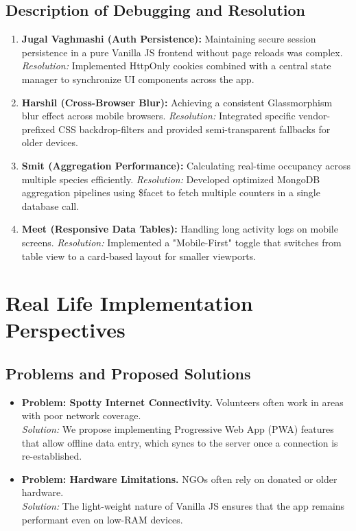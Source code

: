 \documentclass[12pt,a4paper]{report}
\begin{document}
\section{Description of Debugging and Resolution}
\begin{enumerate}
    \item \textbf{Jugal Vaghmashi (Auth Persistence):} Maintaining secure session persistence in a pure Vanilla JS frontend without page reloads was complex. \textit{Resolution:} Implemented HttpOnly cookies combined with a central state manager to synchronize UI components across the app.
    \item \textbf{Harshil (Cross-Browser Blur):} Achieving a consistent Glassmorphism blur effect across mobile browsers. \textit{Resolution:} Integrated specific vendor-prefixed CSS backdrop-filters and provided semi-transparent fallbacks for older devices.
    \item \textbf{Smit (Aggregation Performance):} Calculating real-time occupancy across multiple species efficiently. \textit{Resolution:} Developed optimized MongoDB aggregation pipelines using \$facet to fetch multiple counters in a single database call.
    \item \textbf{Meet (Responsive Data Tables):} Handling long activity logs on mobile screens. \textit{Resolution:} Implemented a "Mobile-First" toggle that switches from table view to a card-based layout for smaller viewports.
\end{enumerate}

\chapter{Real Life Implementation Perspectives}
\section{Problems and Proposed Solutions}
\begin{itemize}
    \item \textbf{Problem: Spotty Internet Connectivity.} Volunteers often work in areas with poor network coverage. \\
    \textit{Solution:} We propose implementing Progressive Web App (PWA) features that allow offline data entry, which syncs to the server once a connection is re-established.
    \item \textbf{Problem: Hardware Limitations.} NGOs often rely on donated or older hardware. \\
    \textit{Solution:} The light-weight nature of Vanilla JS ensures that the app remains performant even on low-RAM devices.
\end{itemize}
\end{document}
